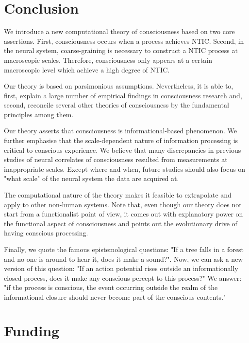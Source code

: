 \documentclass[utf8]{article}
\begin{document}
	\section{Conclusion}
	We introduce a new computational theory of consciousness based on two core assertions. First, consciousness occurs when a process achieves NTIC. Second, in the neural system, coarse-graining is necessary to construct a NTIC process at macroscopic scales. Therefore, consciousness only appears at a certain macroscopic level which achieve a high degree of NTIC. 
	
	Our theory is based on parsimonious assumptions. Nevertheless, it is able to, first, explain a large number of empirical findings in consciousness research and, second, reconcile several other theories of consciousness by the fundamental principles among them. 
	
	Our theory asserts that consciousness is informational-based phenomenon. We further emphasise that the scale-dependent nature of information processing is critical to conscious experience. We believe that many discrepancies in previous studies of neural correlates of consciousness resulted from measurements at inappropriate scales. Except where and when, future studies should also focus on "what scale" of the neural system the data are acquired at.
	
	The computational nature of the theory makes it feasible to extrapolate and apply to other non-human systems. Note that, even though our theory does not start from a functionalist point of view, it comes out with explanatory power on the functional aspect of consciousness and points out the evolutionary drive of having conscious processing. 
	
	Finally, we quote the famous epistemological questions: "If a tree falls in a forest and no one is around to hear it, does it make a sound?". Now, we can ask a new version of this question: "If an action potential rises outside an informationally closed process, does it make any conscious percept to this process?" We answer: "if the process is conscious, the event occurring outside the realm of the informational closure should never become part of the conscious contents."
    
    

	\section*{Funding}
\end{document}
